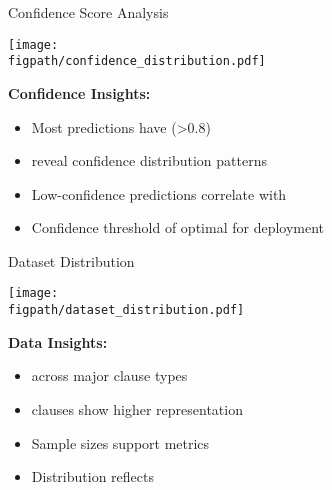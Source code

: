 \begin{frame}{Confidence Score Analysis}
\begin{center}
\texttt{[image: \\figpath/confidence\_distribution.pdf]}
\end{center}

\textbf{Confidence Insights:}
\begin{itemize}
    \item Most predictions have  (>0.8)
    \item {} reveal confidence distribution patterns
    \item Low-confidence predictions correlate with 
    \item Confidence threshold of  optimal for deployment
\end{itemize}
\end{frame}

\begin{frame}{Dataset Distribution}
\begin{center}
\texttt{[image: \\figpath/dataset\_distribution.pdf]}
\end{center}

\textbf{Data Insights:}
\begin{itemize}
    \item {} across major clause types
    \item {} clauses show higher representation
    \item Sample sizes support  metrics
    \item Distribution reflects 
\end{itemize}
\end{frame}

